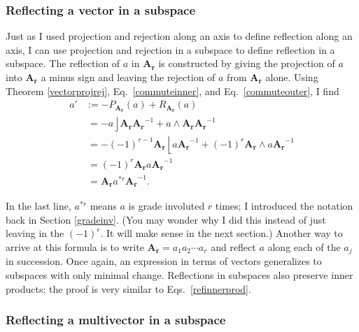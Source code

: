 \documentclass{utarticle}
\newcommand{\bl}[1]{\ensuremath{\bm{#1}}}
\DeclareMathOperator{\lin}{\rfloor}
\DeclareMathOperator{\rin}{\lfloor}
\DeclareMathOperator{\out}{\wedge}
\newcommand{\grinv}[2][]{\ensuremath{#2^{*#1}}}
\begin{document}
\subsubsection{Reflecting a vector in a subspace}
\label{refvecinspace}

Just as I used projection and rejection along an axis to define reflection
along an axis, I can use projection and rejection in a subspace to define reflection in a 
subspace.  The reflection of $a$ in \bl{A_r} is constructed by giving the projection of $a$
into \bl{A_r} a minus sign and leaving the rejection of $a$ from \bl{A_r} alone.  Using
Theorem \ref{vectorprojrej}, Eq.~\eqref{commuteinner}, and Eq.~\eqref{commuteouter}, I find
\begin{align}
a' & := -P_{\bl{A_r}}(a) + R_{\bl{A_r}}(a) \nonumber \\
    & \ = -a \lin \bl{A_r} \bl{A_r}^{-1} + a \out \bl{A_r} \bl{A_r}^{-1} \nonumber \\
    & \ = -(-1)^{r-1}  \bl{A_r} \rin a \bl{A_r}^{-1} + (-1)^r  \bl{A_r} \out a \bl{A_r}^{-1} \nonumber \\
    & \ = (-1)^r \bl{A_r} a \bl{A_r}^{-1} \nonumber \\
    & \ = \bl{A_r} \grinv[r]{a} \bl{A_r}^{-1}.
\label{refainAr}
\end{align}

In the last line, $\grinv[r]{a}$ means $a$ is grade involuted $r$ times; I introduced the notation back 
in Section \ref{gradeinv}.  (You may wonder why I did this instead of just leaving in the $(-1)^r$.  
It will make sense in the next section.)  Another way to arrive at this formula is to write 
$\bl{A_r} = a_1 a_2 \dotsb a_r$ and reflect $a$ along each of the $a_j$ in succession.  Once 
again, an expression in terms of vectors generalizes to subspaces with only minimal change.  
Reflections in subspaces also preserve inner products; the proof is very similar to 
Eqs.~\eqref{refinnerprod}.

\subsubsection{Reflecting a multivector in a subspace}
\label{refmultivector}
\end{document}
